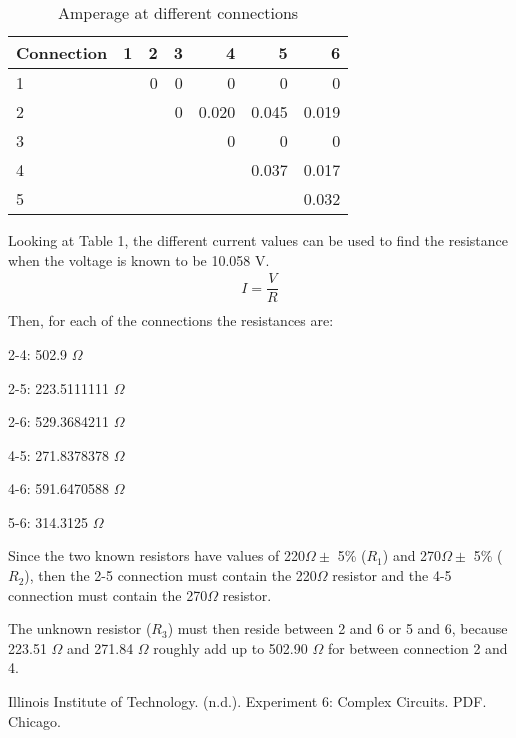 \documentclass [12pt, letterpaper, twoside] {article}
\begin{document}
\begin{table}
  \centering
  \begin{tabular}{| l | r | r | r | r | r | r |}
    \hline\hline
    Connection & 1 & 2 & 3 & 4 & 5 & 6 \\
    \hline
    1 & & 0 & 0 & 0 & 0 & 0 \\
    \hline
    2 & &  & 0 & 0.020 & 0.045 & 0.019 \\
    \hline
    3 & & & & 0 & 0 & 0 \\
    \hline
    4 & & & & & 0.037 & 0.017 \\
    \hline
    5 & & & & & & 0.032 \\
    \hline\hline
  \end{tabular}
  \caption {Amperage at different connections}
\end{table}

Looking at Table 1, the different current values can be used to find the resistance when the voltage is known to be 10.058 V.
\begin{equation}
  \begin{split}
    I = \dfrac{V}{R} \\
  \end{split}
\end{equation}
Then, for each of the connections the resistances are:

2-4: 502.9 \(\Omega\)

2-5: 223.5111111 \(\Omega\)

2-6: 529.3684211 \(\Omega\)

4-5: 271.8378378 \(\Omega\)

4-6: 591.6470588 \(\Omega\)

5-6: 314.3125 \(\Omega\)

Since the two known resistors have values of 220\(\Omega\pm\) 5\% (\(R_{1}\)) and 270\(\Omega\pm\) 5\% (\(R_{2}\)), then the 2-5 connection must contain the 220\(\Omega\) resistor and the 4-5 connection must contain the 270\(\Omega\) resistor.

The unknown resistor (\(R_{3}\)) must then reside between 2 and 6 or 5 and 6, because 223.51 \(\Omega\) and 271.84 \(\Omega\) roughly add up to 502.90 \(\Omega\) for between connection 2 and 4.

  Illinois Institute of Technology. (n.d.). Experiment 6: Complex Circuits. PDF. Chicago.
\end{document}
